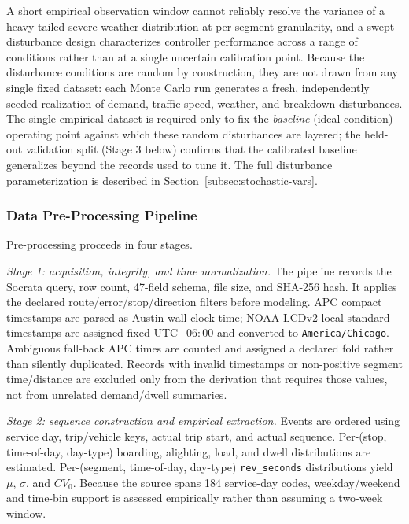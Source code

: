 A short empirical observation window cannot reliably resolve the variance of a heavy-tailed severe-weather distribution at per-segment granularity, and a swept-disturbance design characterizes controller performance across a range of conditions rather than at a single uncertain calibration point. Because the disturbance conditions are random by construction, they are not drawn from any single fixed dataset: each Monte Carlo run generates a fresh, independently seeded realization of demand, traffic-speed, weather, and breakdown disturbances. The single empirical dataset is required only to fix the \textit{baseline} (ideal-condition) operating point against which these random disturbances are layered; the held-out validation split (Stage 3 below) confirms that the calibrated baseline generalizes beyond the records used to tune it. The full disturbance parameterization is described in Section~\ref{subsec:stochastic-vars}.

\fi
\subsubsection{Data Pre-Processing Pipeline}
\label{subsec:data-pipeline}

Pre-processing proceeds in four stages.

\textit{Stage 1: acquisition, integrity, and time normalization.} The pipeline records the Socrata query, row count, 47-field schema, file size, and SHA-256 hash. It applies the declared route/error/stop/direction filters before modeling. APC compact timestamps are parsed as Austin wall-clock time; NOAA LCDv2 local-standard timestamps are assigned fixed UTC$-06{:}00$ and converted to \texttt{America/Chicago}. Ambiguous fall-back APC times are counted and assigned a declared fold rather than silently duplicated. Records with invalid timestamps or non-positive segment time/distance are excluded only from the derivation that requires those values, not from unrelated demand/dwell summaries.

\textit{Stage 2: sequence construction and empirical extraction.} Events are ordered using service day, trip/vehicle keys, actual trip start, and actual sequence. Per-(stop, time-of-day, day-type) boarding, alighting, load, and dwell distributions are estimated. Per-(segment, time-of-day, day-type) \texttt{rev\_seconds} distributions yield $\mu$, $\sigma$, and $CV_0$. Because the source spans 184 service-day codes, weekday/weekend and time-bin support is assessed empirically rather than assuming a two-week window.

